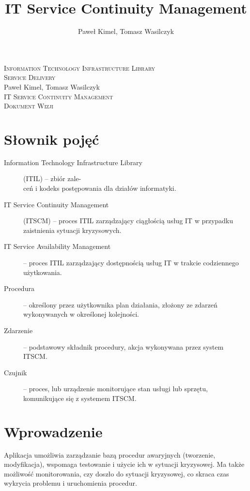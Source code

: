 \documentclass[a4paper,12pt]{article}
\author{Paweł Kimel, Tomasz Wasilczyk}
\title{IT Service Continuity Management}
\renewcommand\maketitle
{
	\begin{titlepage}
	\begin{center}
	
	\textsc{Information Technology Infrastructure Library\\Service Delivery}\\[6cm]
	Paweł Kimel, Tomasz Wasilczyk\\[1cm]
	\textsc{\Large IT Service Continuity Management}\\[0.25cm]
	\textsc{\large Dokument Wizji}\\[8.675cm]
	
	\end{center}
	\end{titlepage}
}
\begin{document}
\maketitle

\setcounter{page}{2}

\tableofcontents

\break


\section{Słownik pojęć}

\begin{description}

	\item[Information Technology Infrastructure Library] (ITIL) -- zbiór zale-\\ceń i kodeks
	postępowania dla działów informatyki.

	\item[IT Service Continuity Management] (ITSCM) -- proces ITIL zarządzający ciągłością
	usług IT w przypadku zaistnienia sytuacji kryzysowych.

	\item[IT Service Availability Management] -- proces ITIL zarządzający dostępnością
	usług IT w trakcie codziennego użytkowania.

	\item[Procedura] -- określony przez użytkownika plan działania, złożony ze zdarzeń
	wykonywanych w określonej kolejności.

	\item[Zdarzenie] -- podstawowy składnik procedury, akcja wykonywana przez system ITSCM.

	\item[Czujnik] -- proces, lub urządzenie monitorujące stan usługi lub sprzętu,
	komunikujące się z systemem ITSCM.

\end{description}


\section{Wprowadzenie}

Aplikacja umożliwia zarządzanie bazą procedur awaryjnych (tworzenie, modyfikacja), wspomaga testowanie
i użycie ich w sytuacji kryzysowej. Ma także możliwość monitorowania, czy doszło do sytuacji kryzysowej,
co skraca czas wykrycia problemu i uruchomienia procedur.
\end{document}
